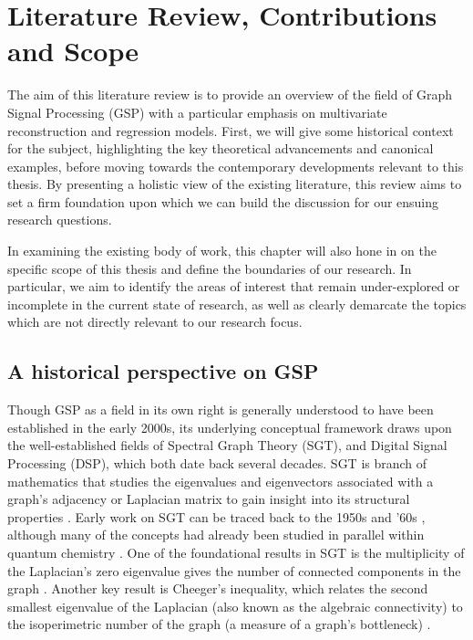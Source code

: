 \chapter{Literature Review, Contributions and Scope} 

\label{chap:lit_review} 


The aim of this literature review is to provide an overview of the field of Graph Signal Processing (GSP) with a particular emphasis on multivariate  reconstruction and regression models. First, we will give some historical context for the subject, highlighting the key theoretical advancements and canonical examples, before moving towards the contemporary developments relevant to this thesis. By presenting a holistic view of the existing literature, this review aims to set a firm foundation upon which we can build the discussion for our ensuing research questions.

In examining the existing body of work, this chapter will also hone in on the specific scope of this thesis and define the boundaries of our research. In particular, we aim to identify the areas of interest that remain under-explored or incomplete in the current state of research, as well as clearly demarcate the topics which are not directly relevant to our research focus. 


\section{A historical perspective on GSP}

Though GSP as a field in its own right is generally understood to have been established in the early 2000s, its underlying conceptual framework draws upon the well-established fields of Spectral Graph Theory (SGT), and Digital Signal Processing (DSP), which both date back several decades. SGT is branch of mathematics that studies the eigenvalues and eigenvectors associated with a graph's adjacency or Laplacian matrix to gain insight into its structural properties \citep{Chung1997}. Early work on SGT can be traced back to the 1950s and '60s \citep{Collatz1957,Hoffman1969}, although many of the concepts had already been studied in parallel within quantum chemistry \citep{Huckel1931}. One of the foundational results in SGT is the multiplicity of the Laplacian's zero eigenvalue gives the number of connected components in the graph \citep{Cvetkovic1980}. Another key result is Cheeger's inequality, which relates the second smallest eigenvalue of the Laplacian (also known as the algebraic connectivity) to the isoperimetric number of the graph (a measure of a graph's bottleneck) \citep{Cheeger1971}. 

